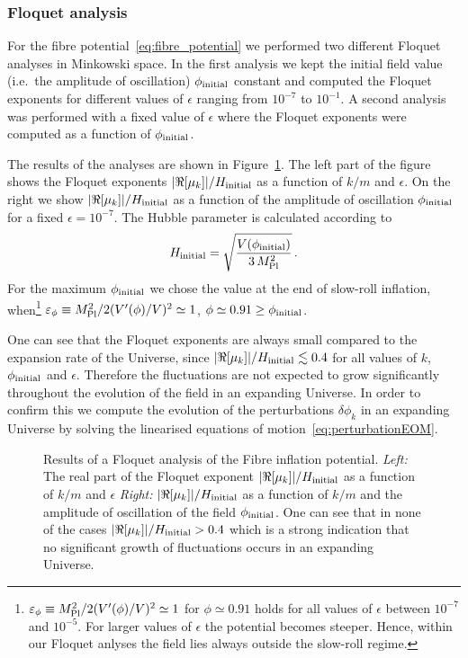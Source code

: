 \documentclass[12pt]{article}
\newcommand{\be}{\begin{equation}}
\newcommand{\ee}{\end{equation}}
\begin{document}
\subsubsection{Floquet analysis}
\label{sec:floquet_fibre}

For the fibre potential~\eqref{eq:fibre_potential} we performed two different Floquet analyses in Minkowski space. In the first analysis we kept the initial field value (i.e.\ the amplitude of oscillation) $\phi_{\rm initial}$ constant and computed the Floquet exponents  for different values of $\epsilon$ ranging from $10^{-7}$ to $10^{-1}$. A second analysis was  performed with a fixed value of $\epsilon$ where the Floquet exponents were computed as a function of $\phi_{\rm initial}$. 

The results of the analyses are shown in Figure~\ref{fig:floquet}. The left part of the figure shows the Floquet exponents $|\Re[\mu_k]|/H_{\rm initial}$ as a function of $k/m$ and $\epsilon$. On the right we show $|\Re[\mu_k]|/H_{\rm initial}$ as a function of the amplitude of oscillation $\phi_{\rm initial}$ for a fixed $\epsilon = 10^{-7}$. The Hubble parameter is calculated according to
\be
H_{\rm initial}=\sqrt{\frac{V(\phi_{\rm initial})}{3\,M^2_{\rm Pl}}}\,.
\ee
For the maximum $\phi_{\rm initial}$ we chose the value at the end of slow-roll inflation, when\footnote{$\varepsilon_\phi \equiv M^2_{\rm Pl}/2(V'(\phi)/V)^2\simeq1$ for $\phi \simeq 0.91$ holds for all values of $\epsilon$ between $10^{-7}$ and $10^{-5}$. For larger values of $\epsilon$ the potential becomes steeper. Hence, within our Floquet anlyses the field lies always outside the slow-roll regime.} $\varepsilon_\phi \equiv M^2_{\rm Pl}/2(V'(\phi)/V)^2\simeq1$, $\phi \simeq 0.91\ge\phi_{\rm initial}$.

One can see that the Floquet exponents are always small compared to the expansion rate of the Universe, since $|\Re[\mu_k]|/H_{\rm initial}\lesssim0.4$ for all values of $k$, $\phi_{\rm initial}$ and $\epsilon$. Therefore the fluctuations are not expected to grow significantly throughout the evolution of the field in an expanding Universe. In order to confirm this we compute the evolution of the perturbations $\delta\phi_k$ in an expanding Universe by solving the linearised equations of motion~\eqref{eq:perturbationEOM}.


\begin{figure}
\centering
{}
\hfill
{}
\caption{Results of a Floquet analysis of the Fibre inflation potential. \textit{Left:} The real part of the Floquet exponent $|\Re[\mu_k]|/H_{\rm initial}$ as a function of $k/m$ and $\epsilon$ \textit{Right:} $|\Re[\mu_k]|/H_{\rm initial}$ as a function of $k/m$ and the amplitude of oscillation of the field $\phi_{\rm initial}$. One can see that in none of the cases $|\Re[\mu_k]|/H_{\rm initial} > 0.4$ which is a strong indication that no significant growth of fluctuations occurs in an expanding Universe.}
\label{fig:floquet}
\end{figure}
\end{document}
